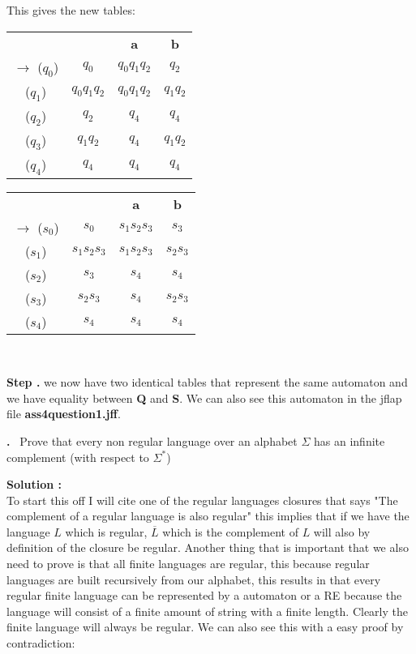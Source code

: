 \documentclass{article}
\newcounter{problem}
\newcounter{solution}
\newcounter{step}
\newcommand\Step{%
  \stepcounter{step}%
  \textbf{Step \thestep. }%
}
\newcommand\Problem{%
  \stepcounter{problem}%
  \textbf{\theproblem.}~%
  \setcounter{solution}{0}%
  \setcounter{step}{0}%
}
\newcommand\TheSolution{%
  \setcounter{step}{0}%
  \textbf{Solution \theproblem:}\\%
}
\begin{document}
This gives the new tables: 

\begin{table}[h!]
  \centering
\begin{tabular}{c c c c|}
       &&\textbf{a}&\textbf{b}\\ 
      \hfill $\to$ ($q_0$)  & $q_0$ & $q_0q_1q_2$ & $q_2$ \\ 
      \hfill *     ($q_1$)  & $q_0q_1q_2$ & $q_0q_1q_2$ & $q_1q_2$ \\ 
      \hfill *     ($q_2$)  & $q_2$ & $q_4$ & $q_4$ \\ 
      \hfill *     ($q_3$)  & $q_1q_2$ & $q_4$ & $q_1q_2$\\ 
      \hfill       ($q_4$)  & $q_4$ & $q_4$ & $q_4$ \\ [0.5ex]
    \end{tabular} 
\begin{tabular}{c c c c}
       &&\textbf{a}&\textbf{b}\\ 
      \hfill $\to$ ($s_0$)  & $s_0$ & $s_1s_2s_3$ & $s_3$ \\ 
      \hfill *     ($s_1$)  & $s_1s_2s_3$ & $s_1s_2s_3$ & $s_2s_3$ \\ 
      \hfill *     ($s_2$)  & $s_3$ & $s_4$ & $s_4$ \\ 
      \hfill *     ($s_3$)  & $s_2s_3$ & $s_4$ & $s_2s_3$\\ 
      \hfill       ($s_4$)  & $s_4$ & $s_4$ & $s_4$ \\ [0.5ex]
    \end{tabular} 
\
\end{table}

\Step we now have two identical tables that represent the same automaton and we have equality between 
\textbf{Q} and \textbf{S}. We can also see this automaton in the jflap file \textbf{ass4question1.jff}.

\newpage
\Problem Prove that every non regular language over an alphabet $\Sigma$ has an infinite
complement (with respect to $\Sigma^*$)

\TheSolution To start this off I will cite one of the regular languages closures that says "The complement of
a regular language is also regular" this implies that if we have the language $L$ which is regular, 
$\overline L$ which is the complement of $L$ will also by definition of the closure be regular. Another 
thing that is important that we also need to prove is that all finite languages are 
regular, this because regular languages are built recursively from our alphabet, this results in that every 
regular finite language can be represented by a automaton or a RE because the language will consist of a 
finite amount of string with a finite length. Clearly the finite language will always be regular. We can also
see this with a easy proof by contradiction:
\end{document}
